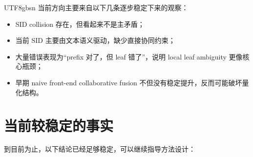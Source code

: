 \documentclass[11pt]{article}
\begin{document}
\begin{CJK*}{UTF8}{gbsn}
当前方向主要来自以下几条逐步稳定下来的观察：

\begin{itemize}
  \item SID collision 存在，但看起来不是主矛盾；
  \item 当前 SID 主要由文本语义驱动，缺少直接协同约束；
  \item 大量错误表现为“prefix 对了，但 leaf 错了”，说明 local leaf ambiguity 更像核心瓶颈；
  \item 早期 naive front-end collaborative fusion 不但没有稳定提升，反而可能破坏量化结构。
\end{itemize}

\section{当前较稳定的事实}

到目前为止，以下结论已经足够稳定，可以继续指导方法设计：


\end{CJK*}
\end{document}
